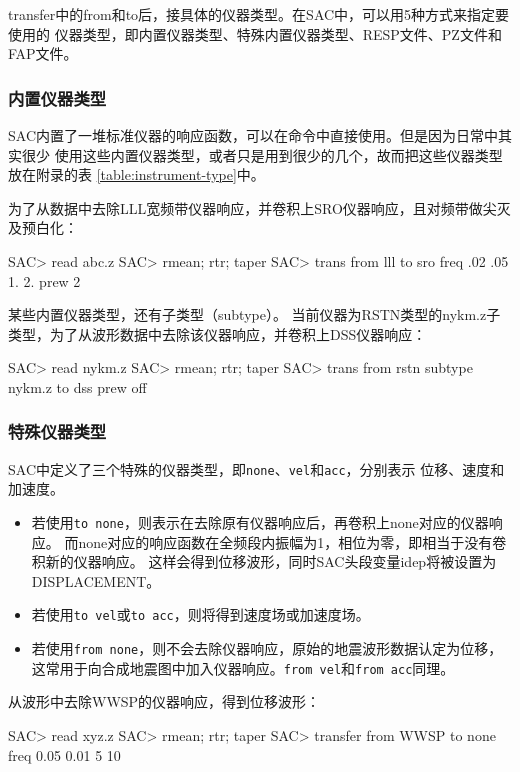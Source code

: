 transfer中的from和to后，接具体的仪器类型。在SAC中，可以用5种方式来指定要使用的
仪器类型，即内置仪器类型、特殊内置仪器类型、RESP文件、PZ文件和FAP文件。

\subsubsection{内置仪器类型}
SAC内置了一堆标准仪器的响应函数，可以在命令中直接使用。但是因为日常中其实很少
使用这些内置仪器类型，或者只是用到很少的几个，故而把这些仪器类型放在附录的表
\ref{table:instrument-type}中。

为了从数据中去除LLL宽频带仪器响应，并卷积上SRO仪器响应，且对频带做尖灭及预白化：
\begin{SACCode}
SAC> read abc.z
SAC> rmean; rtr; taper
SAC> trans from lll to sro freq .02 .05 1. 2. prew 2
\end{SACCode}

某些内置仪器类型，还有子类型（subtype）。
当前仪器为RSTN类型的nykm.z子类型，为了从波形数据中去除该仪器响应，并卷积上DSS仪器响应：
\begin{SACCode}
SAC> read nykm.z
SAC> rmean; rtr; taper
SAC> trans from rstn subtype nykm.z to dss prew off
\end{SACCode}

\subsubsection{特殊仪器类型}
SAC中定义了三个特殊的仪器类型，即\verb+none+、\verb+vel+和\verb+acc+，分别表示
位移、速度和加速度。

\begin{itemize}
\item 若使用\verb+to none+，则表示在去除原有仪器响应后，再卷积上none对应的仪器响应。
    而none对应的响应函数在全频段内振幅为1，相位为零，即相当于没有卷积新的仪器响应。
    这样会得到位移波形，同时SAC头段变量idep将被设置为DISPLACEMENT。
\item 若使用\verb+to vel+或\verb+to acc+，则将得到速度场或加速度场。
\item 若使用\verb+from none+，则不会去除仪器响应，原始的地震波形数据认定为位移，
    这常用于向合成地震图中加入仪器响应。\verb+from vel+和\verb+from acc+同理。
\end{itemize}

从波形中去除WWSP的仪器响应，得到位移波形：
\begin{SACCode}
SAC> read xyz.z
SAC> rmean; rtr; taper
SAC> transfer from WWSP to none freq 0.05 0.01 5 10
\end{SACCode}


